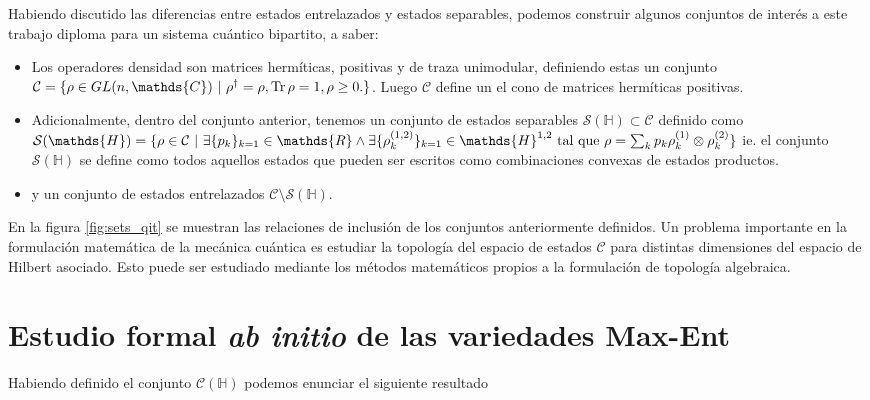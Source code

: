 \documentclass{report} %
\numberwithin{equation}{section}
\begin{document}
Habiendo discutido las diferencias entre estados entrelazados y estados separables, podemos construir algunos conjuntos de interés a este trabajo diploma para un sistema cuántico bipartito, a saber:

\begin{itemize}
    \item Los operadores densidad son matrices hermíticas, positivas y de traza unimodular, definiendo estas un conjunto $\mathcal{C} = \{\rho \in GL(n, \mathds{C}) \textnormal{ }| \textnormal{ }\rho^{\dagger} = \rho, \Tr \rho = 1, \rho \geq 0.\}$. Luego $\mathcal{C}$ define un el cono de matrices hermíticas positivas.
    
    \item Adicionalmente, dentro del conjunto anterior, tenemos un conjunto de estados separables $\mathcal{S}(\mathds{H}) \subset \mathcal{C}$ definido como $\mathcal{S}(\mathds{H})=\{ \rho \in \mathcal{C} \textnormal{ | } \exists \{p_k\}_{k=1} \in \mathds{R} \land \exists \{\rho_{k}^{(1, 2)}\}_{k=1} \in \mathds{H}^{1,2} \textnormal{ tal que }\rho = \sum_{k} p_{k} \rho_{k}^{(1)}\otimes\rho_{k}^{(2)}\}$ ie. el conjunto $\mathcal{S}(\mathds{H})$ se define como todos aquellos estados que pueden ser escritos como combinaciones convexas de estados productos. 
    
    \item y un conjunto de estados entrelazados $\mathcal{C} \setminus \mathcal{S}(\mathds{H})$.
\end{itemize}

En la figura \ref{fig:sets_qit} se muestran las relaciones de inclusión de los conjuntos anteriormente definidos. Un problema importante en la formulación matemática de la mecánica cuántica es estudiar la topología del espacio de estados $\mathcal{C}$ para distintas dimensiones del espacio de Hilbert asociado. Esto puede ser estudiado mediante los métodos matemáticos propios a la formulación de topología algebraica.

\section{Estudio formal \textit{ab initio} de las variedades Max-Ent}
\label{hausdorff}

Habiendo definido el conjunto $\mathcal{C}(\mathds{H})$ podemos enunciar el siguiente resultado 
\end{document}
